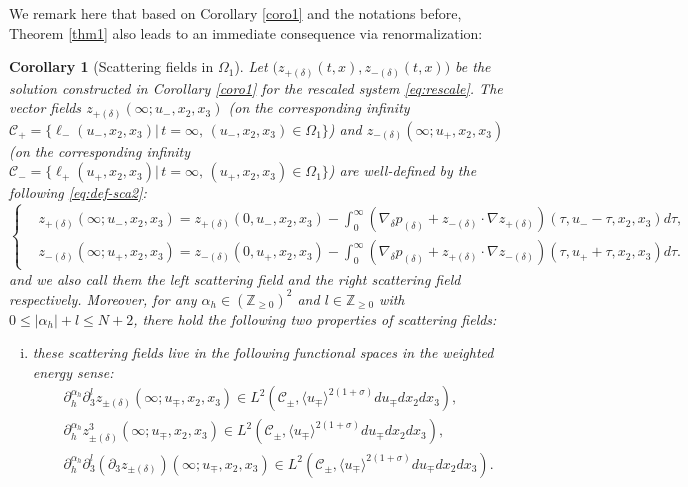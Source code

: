 \documentclass[10pt,reqno]{amsart}
\numberwithin{equation}{section}
\newtheorem{corollary}[theorem]{Corollary}
\begin{document}
We remark here that 
based on Corollary \ref{coro1} and the notations before, Theorem \ref{thm1} also leads to an immediate consequence via renormalization:  
\begin{corollary}[Scattering fields in $\Omega_1$]\label{coro2}
Let  $\big(z_{+(\delta)}(t,x),z_{-(\delta)}(t,x)\big)$ be 	the solution  constructed in Corollary  \ref{coro1} for the rescaled system \eqref{eq:rescale}.
The vector fields $z_{+(\delta)}(\infty;u_-,x_2,x_3)$ (on the corresponding infinity  $\mathcal{C}_+=\big\{\ell_-(u_-,x_2,x_3)\big|\,t=\infty,\, (u_-,x_2,x_3)\in \Omega_1\big\}$) and  $z_{-(\delta)}(\infty;u_+,x_2,x_3)$ (on the corresponding infinity  $\mathcal{C}_-=\big\{\ell_+(u_+,x_2,x_3)\big|\,t=\infty,\, (u_+,x_2,x_3)\in \Omega_1\big\}$) are well-defined by the following \eqref{eq:def-sca2}:
\begin{equation}\label{eq:def-sca2}
	\begin{cases}
		&\displaystyle
		z_{+(\delta)}(\infty;u_-,x_2,x_3)= z_{+(\delta)}(0,u_-,x_2,x_3)- \int_0^{\infty}(\nabla_\delta p_{(\delta)}+z_{-(\delta)}\cdot\nabla z_{+(\delta)})(\tau,u_--\tau,x_2,x_3)d\tau,\\
		&\displaystyle 	z_{-(\delta)}(\infty;u_+,x_2,x_3)= z_{-(\delta)}(0,u_+,x_2,x_3)- \int_0^{\infty}(\nabla_\delta p_{(\delta)}+z_{+(\delta)}\cdot\nabla z_{-(\delta)})(\tau,u_++\tau,x_2,x_3)d\tau.
	\end{cases}	
\end{equation}
and we also call them the left scattering field and the right scattering field respectively. Moreover, for any $\alpha_h\in(\mathbb{Z}_{\geqslant 0})^2$ and $l\in\mathbb{Z}_{\geqslant 0}$ with 
$0\leqslant|\alpha_h|+l\leqslant N+2$,  there hold the following two properties of scattering fields:
\begin{enumerate}[(i)]
	\item 
	these scattering fields live in the following functional spaces in the weighted energy sense:
	\begin{align*}
		&\partial_h^{\alpha_h}\partial_3^l z_{\pm(\delta)}(\infty;u_\mp,x_2,x_3)\in L^2(\mathcal{C}_\pm,\langle u_\mp\rangle^{2(1+\sigma)}du_\mp dx_2dx_3),\\
		&\partial_h^{\alpha_h} z^3_{\pm(\delta)}(\infty;u_\mp,x_2,x_3)\in L^2(\mathcal{C}_\pm,\langle u_\mp\rangle^{2(1+\sigma)}du_\mp dx_2dx_3),\\
		&\partial_h^{\alpha_h}\partial_3^l(\partial_3 z_{\pm(\delta)})(\infty;u_\mp,x_2,x_3)\in L^2(\mathcal{C}_\pm,\langle u_\mp\rangle^{2(1+\sigma)}du_\mp dx_2dx_3).
	\end{align*}

\end{enumerate}
\end{corollary}
\end{document}
